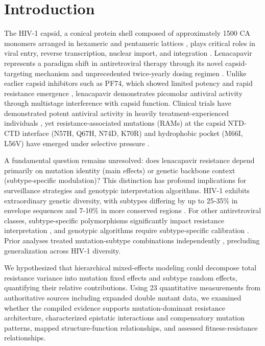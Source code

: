 \documentclass[preprint]{elsarticle}
\begin{document}
\linenumbers

\section{Introduction}

The HIV-1 capsid, a conical protein shell composed of approximately 1500 CA monomers arranged in hexameric and pentameric lattices \cite{Mattei2016}, plays critical roles in viral entry, reverse transcription, nuclear import, and integration \cite{Ganser2019}. Lenacapavir represents a paradigm shift in antiretroviral therapy through its novel capsid-targeting mechanism and unprecedented twice-yearly dosing regimen \cite{Link2020}. Unlike earlier capsid inhibitors such as PF74, which showed limited potency and rapid resistance emergence \cite{Blair2010,Rankovic2018}, lenacapavir demonstrates picomolar antiviral activity through multistage interference with capsid function. Clinical trials have demonstrated potent antiviral activity in heavily treatment-experienced individuals \cite{Segal2022}, yet resistance-associated mutations (RAMs) at the capsid NTD-CTD interface (N57H, Q67H, N74D, K70R) and hydrophobic pocket (M66I, L56V) have emerged under selective pressure \cite{Margot2023}.

A fundamental question remains unresolved: does lenacapavir resistance depend primarily on mutation identity (main effects) or genetic backbone context (subtype-specific modulation)? This distinction has profound implications for surveillance strategies and genotypic interpretation algorithms. HIV-1 exhibits extraordinary genetic diversity, with subtypes differing by up to 25-35\% in envelope sequences and 7-10\% in more conserved regions \cite{Hemelaar2019}. For other antiretroviral classes, subtype-specific polymorphisms significantly impact resistance interpretation \cite{Kantor2005}, and genotypic algorithms require subtype-specific calibration \cite{Wensing2019}. Prior analyses treated mutation-subtype combinations independently \cite{Andreatta2024}, precluding generalization across HIV-1 diversity.

We hypothesized that hierarchical mixed-effects modeling could decompose total resistance variance into mutation fixed effects and subtype random effects, quantifying their relative contributions. Using 23 quantitative measurements from authoritative sources including expanded double mutant data, we examined whether the compiled evidence supports mutation-dominant resistance architecture, characterized epistatic interactions and compensatory mutation patterns, mapped structure-function relationships, and assessed fitness-resistance relationships.
\end{document}
